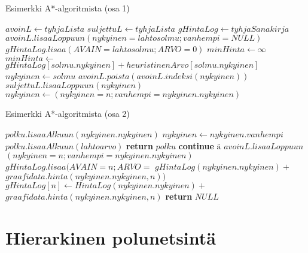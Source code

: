 \begin{algorithm}
\caption{Esimerkki A*-algoritmista (osa 1)}\label{AStarEsim}
\begin{algorithmic}
	\State $avoinL \gets tyhjaLista$
	\State $suljettuL \gets tyhjaLista$
	\State $gHintaLog \gets tyhjaSanakirja$
	\State $avoinL.lisaaLoppuun(nykyinen=lahtosolmu;vanhempi=NULL)$
	\State $gHintaLog.lisaa(AVAIN=lahtosolmu;ARVO=0)$
		\State $minHinta \gets \infty$
				\State $minHinta \gets$
				\State $gHintaLog[solmu.nykyinen]+heuristinenArvo[solmu.nykyinen]$
				\State $nykyinen \gets solmu$
			\EndIf
		\EndFor
		\State $avoinL.poista(avoinL.indeksi(nykyinen))$
		\State $suljettuL.lisaaLoppuun(nykyinen)$
				\State $nykyinen \gets (nykyinen=n;vanhempi=nykyinen.nykyinen)$

\end{algorithmic}
\end{algorithm}
\begin{algorithm}
\caption{Esimerkki A*-algoritmista (osa 2)}
\begin{algorithmic}

					\State $polku.lisaaAlkuun(nykyinen.nykyinen)$
					\State $nykyinen \gets nykyinen.vanhempi$
				\EndWhile
				\State $polku.lisaaAlkuun(lahtoarvo)$
				\State \textbf{return} $polku$
			\EndIf
				\State \textbf{continue} $ä$
			\Else
					\State $avoinL.lisaaLoppuun$
					\State $(nykyinen=n;vanhempi=nykyinen.nykyinen)$
					\State $gHintaLog.lisaa(AVAIN=n;ARVO=$
					\State $gHintaLog(nykyinen.nykyinen)+$
					\State $graafidata.hinta(nykyinen.nykyinen,n))$
				\Else
						\State $gHintaLog[n] \gets HintaLog(nykyinen.nykyinen)+$ 
						\State $graafidata.hinta(nykyinen.nykyinen,n)$
					\EndIf
				\EndIf
			\EndIf
		\EndFor
	\EndWhile
	\State \textbf{return} $NULL$
\EndProcedure
\end{algorithmic}
\end{algorithm}

\section{Hierarkinen polunetsintä}\label{hpa}
